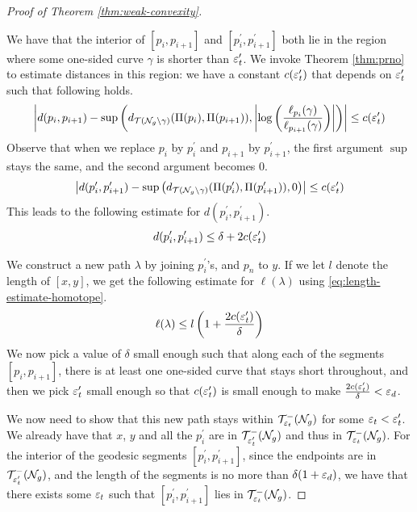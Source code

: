 \begin{proof}[Proof of Theorem \ref{thm:weak-convexity}]
\begin{enumerate}[(i)]
    We have that the interior of $[p_i, p_{i+1}]$ and $[p_i^{\prime}, p_{i+1}^{\prime}]$ both lie in the region where some one-sided curve $\gamma$ is shorter than $\varepsilon_t^{\prime}$.
    We invoke Theorem \ref{thm:prno} to estimate distances in this region: we have a constant $c(\varepsilon_t^{\prime})$ that depends on $\varepsilon_t^{\prime}$ such that following holds.
    \begin{align}
      \label{eq:p-estimate}
      \left| d(p_i, p_{i+1}) - \sup\left( d_{\mathcal{T}(\mathcal{N}_g \setminus \gamma)}(\Pi(p_i), \Pi(p_{i+1})), \left| \log \left( \frac{\ell_{p_i}(\gamma)}{\ell_{p_{i+1}}(\gamma)}  \right) \right| \right) \right| \leq c(\varepsilon_t^{\prime})
    \end{align}
    Observe that when we replace $p_i$ by $p_i^{\prime}$ and $p_{i+1}$ by $p_{i+1}^{\prime}$, the first argument $\sup$ stays the same, and the second argument becomes $0$.
    \begin{align}
      \label{eq:p-prime-estimate}
      \left| d(p_i^{\prime}, p_{i+1}^{\prime}) - \sup\left( d_{\mathcal{T}(\mathcal{N}_g \setminus \gamma)}(\Pi(p_i^{\prime}), \Pi(p_{i+1}^{\prime})), 0 \right) \right| \leq c(\varepsilon_t^{\prime})
    \end{align}
    This leads to the following estimate for $d(p_i^{\prime}, p_{i+1}^{\prime})$.
    \begin{align}
      \label{eq:length-estimate-homotope}
      d(p_i^{\prime}, p_{i+1}^{\prime}) \leq \delta + 2c(\varepsilon_t^{\prime})
    \end{align}
  \end{enumerate}
  We construct a new path $\lambda$ by joining $p_i^{\prime}$'s, and $p_n$ to $y$.
  If we let $l$ denote the length of $[x,y]$, we get the following estimate for $\ell(\lambda)$ using \eqref{eq:length-estimate-homotope}.
  \begin{align*}
    \ell(\lambda) \leq l \left( 1 + \frac{2c(\varepsilon_t^{\prime})}{\delta} \right)
  \end{align*}
  We now pick a value of $\delta$ small enough such that along each of the segments $[p_i, p_{i+1}]$, there is at least one one-sided curve that stays short throughout, and then we pick $\varepsilon_t^{\prime}$ small enough so that $c(\varepsilon_t^{\prime})$ is small enough to make $\frac{2c(\varepsilon_t^{\prime})}{\delta} < \varepsilon_d$.

  We now need to show that this new path stays within $\mathcal{T}_{\varepsilon_t}^{-}(\mathcal{N}_g)$ for some $\varepsilon_t < \varepsilon_t^{\prime}$.
  We already have that $x$, $y$ and all the $p_{i}^{\prime}$ are in $\mathcal{T}_{\varepsilon_t^{\prime}}^{-}(\mathcal{N}_g)$ and thus in $\mathcal{T}_{\varepsilon_t}^{-}(\mathcal{N}_g)$.
  For the interior of the geodesic segments $[p_i^{\prime}, p_{i+1}^{\prime}]$, since the endpoints are in $\mathcal{T}_{\varepsilon_t^{\prime}}^{-}(\mathcal{N}_g)$, and the length of the segments is no more than $\delta(1 + \varepsilon_d)$, we have that there exists some $\varepsilon_t$ such that $[p_i^{\prime}, p_{i+1}^{\prime}]$ lies in $\mathcal{T}_{\varepsilon_t}^{-}(\mathcal{N}_g)$.


\end{proof}
